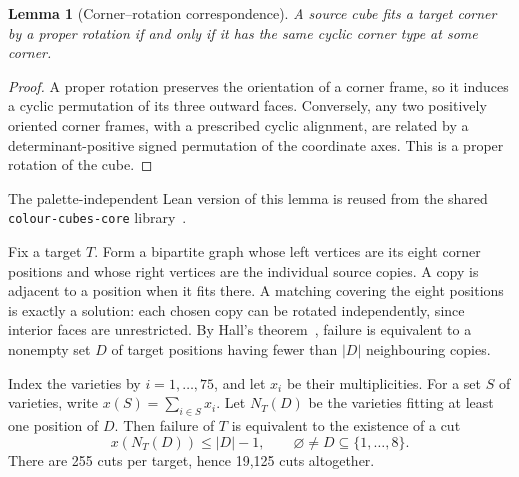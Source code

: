 \documentclass[11pt]{article}
\newtheorem{lemma}[theorem]{Lemma}
\theoremstyle{remark}
\begin{document}
\begin{lemma}[Corner--rotation correspondence]\label{lem:corner}
A source cube fits a target corner by a proper rotation if and only if it
has the same cyclic corner type at some corner.
\end{lemma}
\begin{proof}
A proper rotation preserves the orientation of a corner frame, so it induces
a cyclic permutation of its three outward faces. Conversely, any two
positively oriented corner frames, with a prescribed cyclic alignment,
are related by a determinant-positive signed permutation of the coordinate
axes. This is a proper rotation of the cube.
\end{proof}
The palette-independent Lean version of this lemma is reused from the
shared \texttt{colour-\allowbreak cubes-\allowbreak core} library~\cite{ColourCubes}.

Fix a target $T$. Form a bipartite graph whose left vertices are its eight
corner positions and whose right vertices are the individual source copies.
A copy is adjacent to a position when it fits there. A matching covering
the eight positions is exactly a solution: each chosen copy can be rotated
independently, since interior faces are unrestricted. By Hall's
theorem~\cite{Hall}, failure is equivalent to a nonempty set $D$ of target
positions having fewer than $|D|$ neighbouring copies.

Index the varieties by $i=1,\ldots,75$, and let $x_i$ be their multiplicities.
For a set $S$ of varieties, write $x(S)=\sum_{i\in S}x_i$.
Let $N_T(D)$ be the varieties fitting at least one position of $D$. Then
failure of $T$ is equivalent to the existence of a cut
\begin{equation}\label{eq:hall}
  x(N_T(D))\le |D|-1,\qquad \varnothing\ne D\subseteq\{1,\ldots,8\}.
\end{equation}
There are 255 cuts per target, hence 19,125 cuts altogether.


\end{document}
